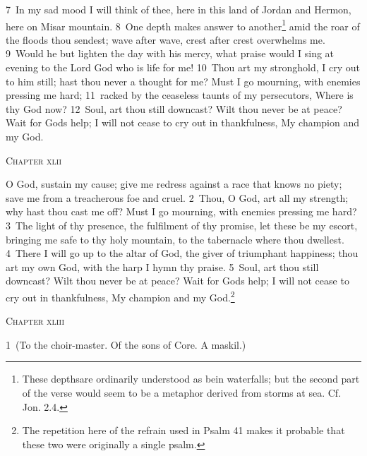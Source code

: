 \documentclass[10pt]{book} %
\begin{document}
\textcolor{benred8}{7}~In my sad mood I will think of thee, here in this land of Jordan and Hermon, here on Misar mountain. \textcolor{benred8}{8}~One depth makes answer to another\footnote[1]{These \textasciigrave depths\textquotesingle  are ordinarily understood as bein waterfalls; but the second part of the verse would seem to be a metaphor derived from storms at sea. Cf. Jon. 2.4.} amid the roar of the floods thou sendest; wave after wave, crest after crest overwhelms me. \textcolor{benred8}{9}~Would he but lighten the day with his mercy, what praise would I sing at evening to the Lord God who is life for me! \textcolor{benred8}{10}~Thou art my stronghold, I cry out to him still; hast thou never a thought for me? Must I go mourning, with enemies pressing me hard; \textcolor{benred8}{11}~racked by the ceaseless taunts of my persecutors, Where is thy God now? \textcolor{benred8}{12}~Soul, art thou still downcast? Wilt thou never be at peace? Wait for God\textquotesingle s help; I will not cease to cry out in thankfulness, My champion and my God.
\begin{large}\begin{center}\textsc{Chapter xlii}\end{center}\end{large}
\lettrine[lines=2]{O}{} God, sustain my cause; give me redress against a race that knows no piety; save me from a treacherous foe and cruel. \textcolor{benred8}{2}~Thou, O God, art all my strength; why hast thou cast me off? Must I go mourning, with enemies pressing me hard? \textcolor{benred8}{3}~The light of thy presence, the fulfilment of thy promise, let these be my escort, bringing me safe to thy holy mountain, to the tabernacle where thou dwellest. \textcolor{benred8}{4}~There I will go up to the altar of God, the giver of triumphant happiness; thou art my own God, with the harp I hymn thy praise. \textcolor{benred8}{5}~Soul, art thou still downcast? Wilt thou never be at peace? Wait for God\textquotesingle s help; I will not cease to cry out in thankfulness, My champion and my God.\footnote[1]{The repetition here of the refrain used in Psalm 41 makes it probable that these two were originally a single psalm.}
\begin{large}\begin{center}\textsc{Chapter xliii}\end{center}\end{large}
\textcolor{benred8}{1}~(To the choir-master. Of the sons of Core. A maskil.)
\end{document}
